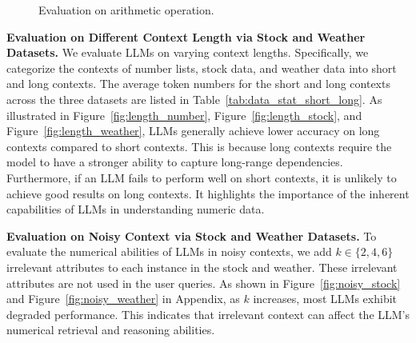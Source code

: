 \begin{figure*}[t]
	\vspace{-1em}
	\centering 	
	\hfill
 
	\caption{Evaluation on arithmetic operation.}
	\label{fig:arithmetic_fig}
		\vspace{-1em}
\end{figure*}



 



 
\noindent \textbf{Evaluation on  Different Context Length via Stock and Weather Datasets.}
We evaluate LLMs on varying context lengths.
Specifically, we categorize the contexts of number lists, stock data, and weather data into short and long contexts.
The average token numbers for the short and long contexts across the three datasets are listed in Table~\ref{tab:data_stat_short_long}.
As illustrated in Figure~\ref{fig:length_number}, Figure~\ref{fig:length_stock}, and Figure~\ref{fig:length_weather},
LLMs generally achieve lower accuracy on long contexts compared to short contexts. This is because long contexts require the model to have a stronger ability to capture long-range dependencies.
Furthermore, if an LLM fails to perform well on short contexts, it is unlikely to achieve good results on long contexts. 
It highlights the importance of the inherent capabilities of LLMs in understanding numeric data.



\noindent \textbf{Evaluation on Noisy Context  via Stock and Weather Datasets.}
To evaluate the numerical abilities of LLMs in  noisy contexts, we add $k\in\{2,4,6\}$ irrelevant attributes to each instance in the stock and weather. 
These irrelevant attributes are not used in the user queries.
As shown in Figure~\ref{fig:noisy_stock} and Figure~\ref{fig:noisy_weather} in Appendix, 
as $k$ increases, most LLMs exhibit degraded performance. This indicates that irrelevant context can  affect the LLM's numerical retrieval and reasoning abilities.

 

